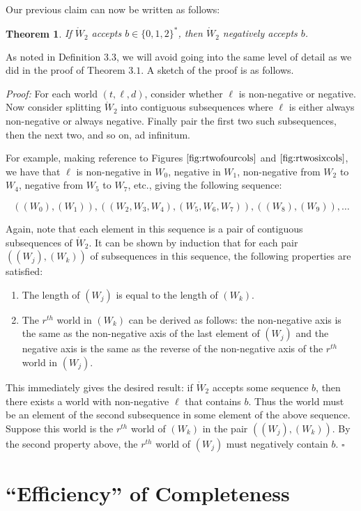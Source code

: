 \documentclass[12pt]{amsart}
\newtheorem{theorem}{Theorem}[section]
\newcommand{\wtwo}{\mathring{W}_2}
\begin{document}
Our previous claim can now be written as follows:

\begin{theorem}
If $\wtwo$ accepts $b\in \{0,1,2\}^*$, then $\wtwo$ negatively accepts $b$.
\end{theorem}

As noted in Definition $3.3$, we will avoid going into the same level of detail as we did in the proof of Theorem $3.1$. A sketch of the proof is as follows.

\textit{Proof:} For each world $(t,\ell,d)$, consider whether $\ell$ is non-negative or negative. Now consider splitting $\wtwo$ into contiguous subsequences where $\ell$ is either always non-negative or always negative. Finally pair the first two such subsequences, then the next two, and so on, ad infinitum.

For example, making reference to Figures $\ref{fig:rtwofourcols}$ and $\ref{fig:rtwosixcols}$, we have that $\ell$ is non-negative in $W_0$, negative in $W_1$, non-negative from $W_2$ to $W_4$, negative from $W_5$ to $W_7$, etc., giving the following sequence:

$$((W_0),(W_1)),((W_2,W_3,W_4),(W_5,W_6,W_7)),((W_8),(W_9)),\ldots$$

Again, note that each element in this sequence is a pair of contiguous subsequences of $\wtwo$. It can be shown by induction that for each pair $((W_j),(W_k))$ of subsequences in this sequence, the following properties are satisfied:

\begin{enumerate}
\item The length of $(W_j)$ is equal to the length of $(W_k)$.
\item The $r^{th}$ world in $(W_k)$ can be derived as follows: the non-negative axis is the same as the non-negative axis of the last element of $(W_j)$ and the negative axis is the same as the reverse of the non-negative axis of the $r^{th}$ world in $(W_j)$.
\end{enumerate}

This immediately gives the desired result: if $\wtwo$ accepts some sequence $b$, then there exists a world with non-negative $\ell$ that contains $b$. Thus the world must be an element of the second subsequence in some element of the above sequence. Suppose this world is the $r^{th}$ world of $(W_k)$ in the pair $((W_j),(W_k))$. By the second property above, the $r^{th}$ world of $(W_j)$ must negatively contain $b$. $\square$

\section{``Efficiency'' of Completeness\label{sec:efficiency}}
\end{document}
